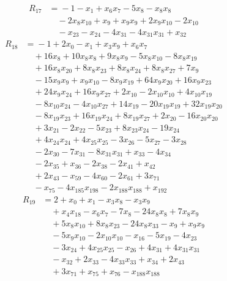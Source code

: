 \begin{align*}
R_{17}&={}-1 -x_{1} +x_{6}x_{7} -5x_{8} -x_{8}x_{8}\\
&\quad{}-2x_{8}x_{10} +x_{9} +x_{9}x_{9} +2x_{9}x_{10} -2x_{10}\\
&\quad{}-x_{23} -x_{24} -4x_{31} -4x_{31}x_{31} +x_{32}
\end{align*}
\begin{align*}
R_{18}&={}-1 +2x_{0} -x_{1} +x_{3}x_{9} +x_{6}x_{7}\\
&\quad{}+16x_{8} +10x_{8}x_{8} +9x_{8}x_{9} -5x_{8}x_{10} -8x_{8}x_{19}\\
&\quad{}+16x_{8}x_{20} +8x_{8}x_{23} +8x_{8}x_{24} +8x_{8}x_{27} +7x_{9}\\
&\quad{}-15x_{9}x_{9} +x_{9}x_{10} -8x_{9}x_{19} +64x_{9}x_{20} +16x_{9}x_{23}\\
&\quad{}+24x_{9}x_{24} +16x_{9}x_{27} +2x_{10} -2x_{10}x_{10} +4x_{10}x_{19}\\
&\quad{}-8x_{10}x_{24} -4x_{10}x_{27} +14x_{19} -20x_{19}x_{19} +32x_{19}x_{20}\\
&\quad{}-8x_{19}x_{23} +16x_{19}x_{24} +8x_{19}x_{27} +2x_{20} -16x_{20}x_{20}\\
&\quad{}+3x_{21} -2x_{22} -5x_{23} +8x_{23}x_{24} -19x_{24}\\
&\quad{}+4x_{24}x_{24} +4x_{25}x_{25} -3x_{26} -5x_{27} -3x_{28}\\
&\quad{}-2x_{30} -7x_{31} -8x_{31}x_{31} +x_{33} -4x_{34}\\
&\quad{}-2x_{35} +x_{36} -2x_{38} -2x_{41} +x_{42}\\
&\quad{}+2x_{43} -x_{59} -4x_{60} -2x_{61} +3x_{71}\\
&\quad{}-x_{75} -4x_{185}x_{198} -2x_{188}x_{188} +x_{192}
\end{align*}
\begin{align*}
R_{19}&={}2 +x_{0} +x_{1} -x_{3}x_{8} -x_{3}x_{9}\\
&\quad{}+x_{4}x_{18} -x_{6}x_{7} -7x_{8} -24x_{8}x_{8} +7x_{8}x_{9}\\
&\quad{}+5x_{8}x_{10} +8x_{8}x_{23} -24x_{8}x_{33} -x_{9} +x_{9}x_{9}\\
&\quad{}-5x_{9}x_{10} -2x_{10}x_{10} -x_{16} -5x_{19} -4x_{23}\\
&\quad{}-3x_{24} +4x_{25}x_{25} -x_{26} +4x_{31} +4x_{31}x_{31}\\
&\quad{}-x_{32} +2x_{33} -4x_{33}x_{33} +x_{34} +2x_{43}\\
&\quad{}+3x_{71} +x_{75} +x_{76} -x_{188}x_{188}
\end{align*}
